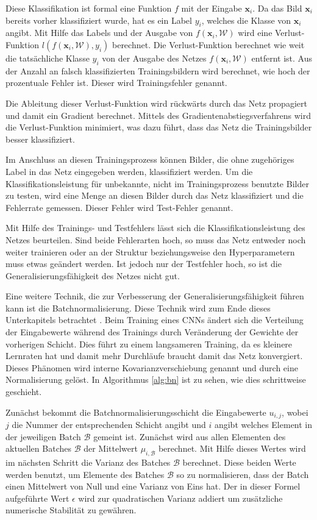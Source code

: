 Diese Klassifikation ist formal eine Funktion $f$ mit der Eingabe $\mathbf{x}_i$. Da das Bild $\mathbf{x}_i$ bereits vorher klassifiziert wurde, hat es ein Label $y_i$, welches die Klasse von $\mathbf{x}_i$ angibt. Mit Hilfe das Labels und der Ausgabe von $f(\mathbf{x}_i, \mathcal{W})$ wird eine Verlust-Funktion $l(f(\mathbf{x}_i,\mathcal{W}),y_i)$ berechnet. Die Verlust-Funktion berechnet wie weit die tatsächliche Klasse $y_i$ von der Ausgabe des Netzes $f(\mathbf{x}_i, \mathcal{W})$ entfernt ist. Aus der Anzahl an falsch klassifizierten Trainingsbildern wird berechnet, wie hoch der prozentuale Fehler ist. Dieser wird Trainingsfehler genannt.


Die Ableitung dieser Verlust-Funktion wird rückwärts durch das Netz propagiert und damit ein Gradient berechnet. Mittels des Gradientenabstiegsverfahrens wird die Verlust-Funktion minimiert, was dazu führt, dass das Netz die Trainingsbilder besser klassifiziert. 


Im Anschluss an diesen Trainingsprozess können Bilder, die ohne zugehöriges Label in das Netz eingegeben werden, klassifiziert werden. Um die Klassifikationsleistung für unbekannte, nicht im Trainingsprozess benutzte Bilder zu testen, wird eine Menge an diesen Bilder durch das Netz klassifiziert und die Fehlerrate gemessen. Dieser Fehler wird Test-Fehler genannt. 


Mit Hilfe des Trainings- und Testfehlers lässt sich die Klassifikationsleistung des Netzes beurteilen. Sind beide Fehlerarten hoch, so muss das Netz entweder noch weiter trainieren oder an der Struktur beziehungsweise den Hyperparametern muss etwas geändert werden. Ist jedoch nur der Testfehler hoch, so ist die Generalisierungsfähigkeit des Netzes nicht gut. 

Eine weitere Technik, die zur Verbesserung der Generalisierungsfähigkeit führen kann ist die Batchnormalisierung. Diese Technik wird zum Ende dieses Unterkapitels betrachtet \cite{batchnorm}. Beim Training eines CNNs ändert sich die Verteilung der Eingabewerte während des Trainings durch Veränderung der Gewichte der vorherigen Schicht. Dies führt zu einem langsameren Training, da es kleinere Lernraten hat und damit mehr Durchläufe braucht damit das Netz konvergiert. Dieses Phänomen wird interne Kovarianzverschiebung genannt und durch eine Normalisierung gelöst. In Algorithmus \ref{alg:bn} ist zu sehen, wie dies schrittweise geschieht.


Zunächst bekommt die Batchnormalisierungsschicht die Eingabewerte $u_{i,j}$, wobei $j$ die Nummer der entsprechenden Schicht angibt und $i$ angibt welches Element in der jeweiligen Batch $\mathcal{B}$ gemeint ist. Zunächst wird aus allen Elementen des aktuellen Batches $\mathcal{B}$ der Mittelwert $\mu_{i,\mathcal{B}}$ berechnet. Mit Hilfe dieses Wertes wird im nächsten Schritt die Varianz des Batches $\mathcal{B}$ berechnet. Diese beiden Werte werden benutzt, um Elemente des Batches $\mathcal{B}$ so zu normalisieren, dass der Batch einen Mittelwert von Null und eine Varianz von Eins hat. Der in dieser Formel aufgeführte Wert $\epsilon$ wird zur quadratischen Varianz addiert um zusätzliche numerische Stabilität zu gewähren. 


